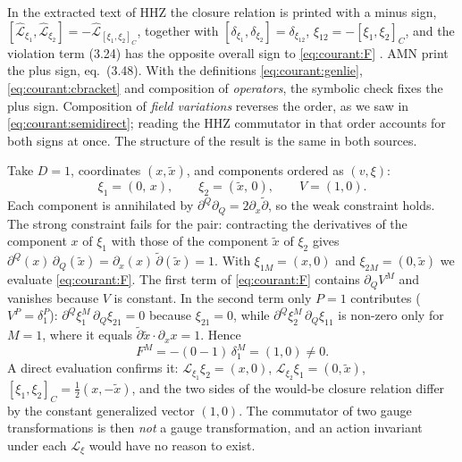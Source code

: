 \begin{remark}\label{rem:courant:sign}
In the extracted text of HHZ the closure relation is printed with a minus sign,
$[\hat{\mathcal L}_{\xi_1},\hat{\mathcal L}_{\xi_2}]=-\hat{\mathcal L}_{[\xi_1,\xi_2]_C}$, together
with $[\delta_{\xi_1},\delta_{\xi_2}]=\delta_{\xi_{12}}$, $\xi_{12}=-[\xi_1,\xi_2]_C$, and the
violation term (3.24) has the opposite overall sign to \eqref{eq:courant:F}
. AMN print the plus sign, eq.~(3.48). With the definitions
\eqref{eq:courant:genlie}, \eqref{eq:courant:cbracket} and composition of \emph{operators}, the
symbolic check fixes the plus sign. Composition of \emph{field variations} reverses the order, as
we saw in \eqref{eq:courant:semidirect}; reading the HHZ commutator in that order accounts for both
signs at once. The structure of the result is the same in both sources.
\end{remark}

\begin{example}\label{ex:courant:fail}
Take $D=1$, coordinates $(x,\tilde x)$, and components ordered as $(v,\xi)$:
\[
\xi_1=(0,\,x),\qquad \xi_2=(\tilde x,\,0),\qquad V=(1,0).
\]
Each component is annihilated by $\partial^Q\partial_Q=2\partial_x\tilde\partial$, so the weak
constraint holds. The strong constraint fails for the pair: contracting the derivatives of the component $x$
of $\xi_1$ with those of the component $\tilde x$ of $\xi_2$ gives
$\partial^Q(x)\,\partial_Q(\tilde x)=\partial_x(x)\,\tilde\partial(\tilde x)=1$. With
$\xi_{1M}=(x,0)$ and $\xi_{2M}=(0,\tilde x)$ we evaluate \eqref{eq:courant:F}. The first term
of \eqref{eq:courant:F} contains $\partial_QV^M$ and vanishes because $V$ is constant. In the
second term only $P=1$ contributes ($V^P=\delta^P_1$):
$\partial^Q\xi_1^M\,\partial_Q\xi_{21}=0$ because $\xi_{21}=0$, while
$\partial^Q\xi_2^M\,\partial_Q\xi_{11}$ is non-zero only for $M=1$, where it equals
$\tilde\partial\tilde x\cdot\partial_xx=1$. Hence
\[
F^M=-(0-1)\,\delta^M_1=(1,0)\neq0 .
\]
A direct evaluation confirms it: $\mathcal L_{\xi_1}\xi_2=(x,0)$,
$\mathcal L_{\xi_2}\xi_1=(0,\tilde x)$, $[\xi_1,\xi_2]_C=\tfrac12(x,-\tilde x)$, and the two sides
of the would-be closure relation differ by the constant generalized vector $(1,0)$. The
commutator of two gauge transformations is then \emph{not} a gauge transformation, and an action
invariant under each $\mathcal L_\xi$ would have no reason to exist.
\end{example}

